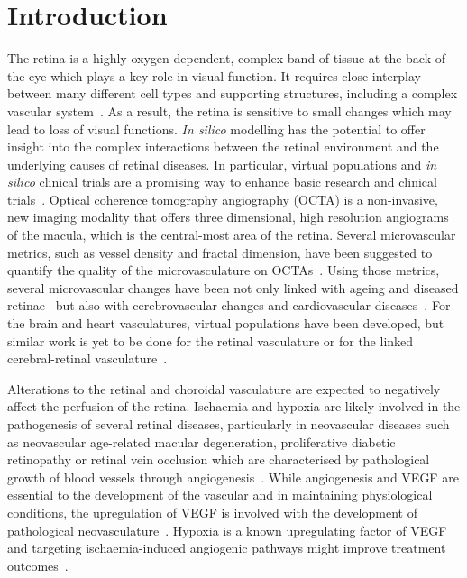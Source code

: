 \documentclass[11pt,]{article}
\begin{document}
\section{Introduction}\label{introduction}

The retina is a highly oxygen-dependent, complex band of tissue at the back of the eye which plays a key role in visual function.
It requires close interplay between many different cell types and supporting structures, including a complex vascular system~\cite{Hernandez2023}.
As a result, the retina is sensitive to small changes which may lead to loss of visual functions.
\textit{In silico} modelling has the potential to offer insight into the complex interactions between the retinal environment and the underlying causes of retinal diseases.
In particular, virtual populations and \textit{in silico} clinical trials are a promising way to enhance basic research and clinical trials~\cite{Hernandez2023}.
Optical coherence tomography angiography (OCTA) is a non-invasive, new imaging modality that offers three dimensional, high resolution angiograms of the macula, which is the central-most area of the retina.
Several microvascular metrics, such as vessel density and fractal dimension, have been suggested to quantify the quality of the microvasculature on OCTAs~\cite{Chu2016}.
Using those metrics, several microvascular changes have been not only linked with ageing and diseased retinae~\cite{ElBouri_2021,Ma2021,Trinh_2019,Told2023,Xue_2021} but also with cerebrovascular changes and cardiovascular diseases~\cite{Pleouras_2021,Graff_2021,LopezCuenca_2022}.
For the brain and heart vasculatures, virtual populations have been developed, but similar work is yet to be done for the retinal vasculature or for the linked cerebral-retinal vasculature~\cite{Hernandez2023}.

Alterations to the retinal and choroidal vasculature are expected to negatively affect the perfusion of the retina.
Ischaemia and hypoxia are likely involved in the pathogenesis of several retinal diseases, particularly in neovascular diseases such as neovascular age-related
macular degeneration, proliferative diabetic retinopathy or retinal
vein occlusion which are characterised by pathological growth of blood
vessels through angiogenesis~\cite{Medina_2016}.
While angiogenesis and VEGF are essential to the development of the vascular and in maintaining physiological conditions, the upregulation of VEGF is involved with the development of pathological neovasculature~\cite{Fruttiger_2007,Nishinaka_2018}. 
Hypoxia is a known upregulating factor of VEGF and targeting ischaemia-induced angiogenic pathways might improve treatment outcomes~\cite{UsuiOuchi2020}.
\end{document}
